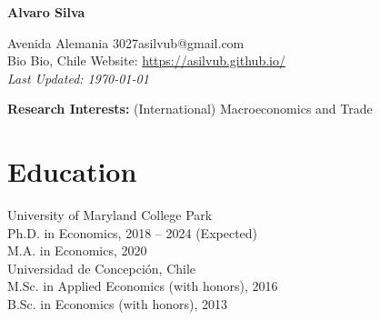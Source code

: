 \documentclass[10pt]{article}
\begin{document}
\begin{center}
\begin{Large} \bfseries Alvaro Silva\end{Large}
\end{center}


\vspace*{0.2in}
\noindent Avenida Alemania 3027\hfill  asilvub@gmail.com \\
Bio Bio, Chile \hfill Website: \href{https://asilvub.github.io/}{https://asilvub.github.io/} \\
\hfill \emph{Last Updated: \today}\\

\vspace*{-0.1in}


\noindent \textbf{\normalsize Research Interests: } (International) Macroeconomics and Trade

\section*{Education}
 University of Maryland College Park\\
\indent Ph.D. in Economics, 2018 --  2024 (Expected)\\
\indent M.A. in Economics, 2020 \\[-0.1in]

\noindent Universidad de Concepci\'on, Chile\\
\indent M.Sc. in Applied Economics (with honors), 2016 \\
\indent B.Sc. in Economics (with honors), 2013

\end{document}
